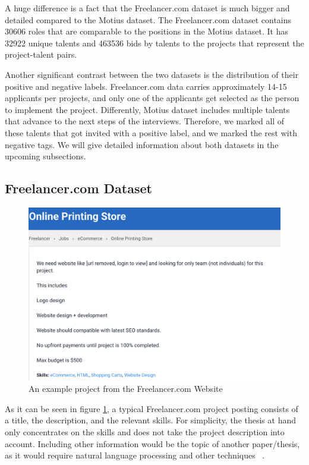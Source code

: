 A huge difference is a fact that the Freelancer.com dataset is much bigger and detailed compared to the Motius dataset. The Freelancer.com dataset contains 30606 roles that are comparable to the positions in the Motius dataset. It has 32922 unique talents and 463536 bids by talents to the projects that represent the project-talent pairs.



Another significant contrast between the two datasets is the distribution of their positive and negative labels. Freelancer.com data carries approximately 14-15 applicants per projects, and only one of the applicants get selected as the person to implement the project. Differently,  Motius dataset includes multiple talents that advance to the next steps of the interviews. Therefore, we marked all of these talents that got invited with a positive label, and we marked the rest with negative tags. We will give detailed information about both datasets in the upcoming subsections.


\subsection{Freelancer.com Dataset}\label{implementation-subsection-freelancer}


\begin{figure}[htp]
	\centering
	\includegraphics[width=\textwidth]{figures/FreelancerExample.png}
	\caption{An example project from the Freelancer.com Website}
	\label{fig:freelancer-example-project}
\end{figure}


As it can be seen in figure \ref{fig:freelancer-example-project}, a typical Freelancer.com project posting consists of a title, the description, and the relevant skills. For simplicity, the thesis at hand only concentrates on the skills and does not take the project description into account. Including other information would be the topic of another paper/thesis, as it would require natural language processing and other techniques ~\parencite{bird2009natural}.


